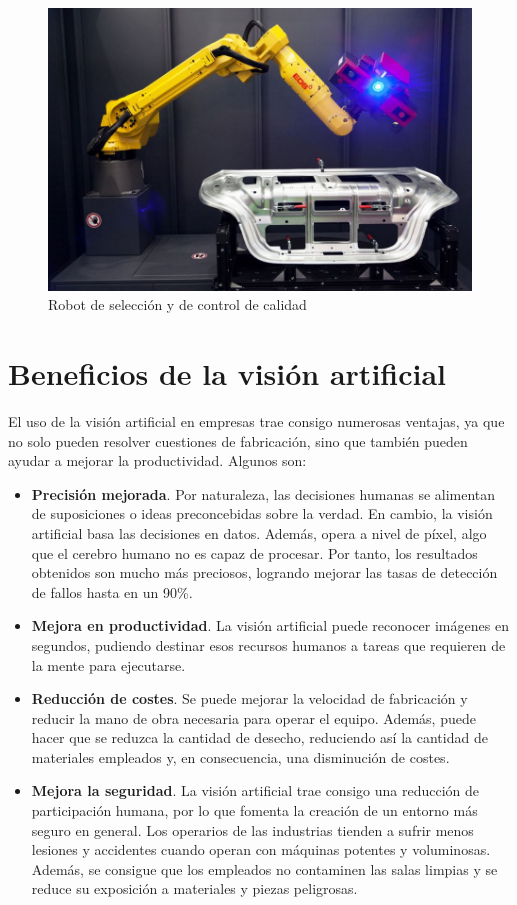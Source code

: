 \begin{figure}[H]
    \centering
    \includegraphics[width=0.5\linewidth]{Images/vision-artificial-tipos-y-aplicaciones.jpg}
    \caption{Robot de selección y de control de calidad}
\end{figure}

\newpage
\section{Beneficios de la visión artificial}
El uso de la visión artificial en empresas trae consigo numerosas ventajas, ya que no solo pueden resolver cuestiones de fabricación, sino que también pueden ayudar a mejorar la productividad. Algunos son: 

\begin{itemize}
    \item \textbf{Precisión mejorada}. Por naturaleza, las decisiones humanas se alimentan de suposiciones o ideas preconcebidas sobre la verdad. En cambio, la visión artificial basa las decisiones en datos. Además, opera a nivel de píxel, algo que el cerebro humano no es capaz de procesar. Por tanto, los resultados obtenidos son mucho más preciosos, logrando mejorar las tasas de detección de fallos hasta en un 90\%. 
    \item \textbf{Mejora en productividad}. La visión artificial puede reconocer imágenes en segundos, pudiendo destinar esos recursos humanos a tareas que requieren de la mente para ejecutarse.
    \item \textbf{Reducción de costes}. Se puede mejorar la velocidad de fabricación y reducir la mano de obra necesaria para operar el equipo. Además, puede hacer que se reduzca la cantidad de desecho, reduciendo así la cantidad de materiales empleados y, en consecuencia, una disminución de costes.
    \item \textbf{Mejora la seguridad}. La visión artificial trae consigo una reducción de participación humana, por lo que fomenta la creación de un entorno más seguro en general. Los operarios de las industrias tienden a sufrir menos lesiones y accidentes cuando operan con máquinas potentes y voluminosas. Además, se consigue que los empleados no contaminen las salas limpias y se reduce su exposición a materiales y piezas peligrosas.
\end{itemize}

